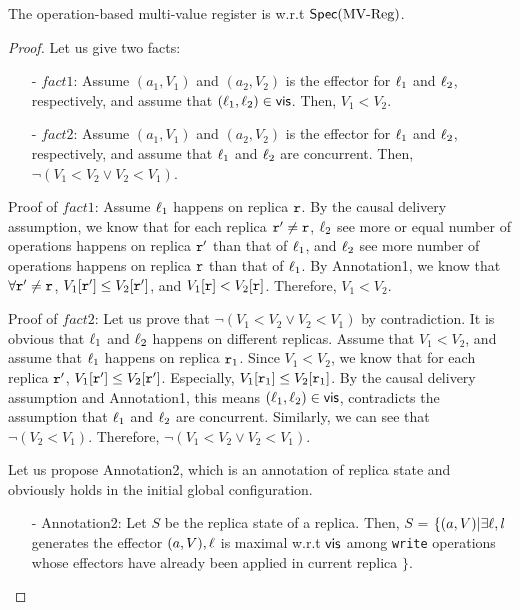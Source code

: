 \begin{lemma}
\label{lemma:multi-value register is correct}
The operation-based multi-value register is \crdtlinearizable{} w.r.t $\mathsf{Spec}(\text{MV\text{-}Reg})$.
\end{lemma}

\begin {proof}

Let us give two facts:

\begin{itemize}
\setlength{\itemsep}{0.5pt}
\item[-] $fact1$: Assume $(a_1,V_1)$ and $(a_2,V_2)$ is the effector for $\ell_1$ and $\ell_2$, respectively, and assume that $(\ell_1,\ell_2) \in \mathsf{vis}$. Then, $V_1 < V_2$.
\item[-] $fact2$: Assume $(a_1,V_1)$ and $(a_2,V_2)$ is the effector for $\ell_1$ and $\ell_2$, respectively, and assume that $\ell_1$ and $\ell_2$ are concurrent. Then, $\neg (V_1 < V_2 \vee V_2 < V_1)$.
\end{itemize}


\noindent Proof of $fact1$: Assume $\ell_1$ happens on replica $\mathtt{r}$. By the causal delivery assumption, we know that for each replica $\mathtt{r}' \neq \mathtt{r}$, $\ell_2$ see more or equal number of operations happens on replica $\mathtt{r}'$ than that of $\ell_1$, and $\ell_2$ see more number of operations happens on replica $\mathtt{r}$ than that of $\ell_1$. By Annotation1, we know that $\forall \mathtt{r}' \neq \mathtt{r}$, $V_1[\mathtt{r}'] \leq V_2[\mathtt{r}']$, and $V_1[\mathtt{r}] < V_2[\mathtt{r}]$. Therefore, $V_1 < V_2$.

\noindent Proof of $fact2$: Let us prove that $\neg (V_1 < V_2 \vee V_2 < V_1)$ by contradiction. It is obvious that $\ell_1$ and $\ell_2$ happens on different replicas. Assume that $V_1 < V_2$, and assume that $\ell_1$ happens on replica $\mathtt{r}_1$. Since $V_1 < V_2$, we know that for each replica $\mathtt{r}'$, $V_1[\mathtt{r}'] \leq V_2[\mathtt{r}']$. Especially, $V_1[\mathtt{r}_1] \leq V_2[\mathtt{r}_1]$. By the causal delivery assumption and Annotation1, this means $(\ell_1,\ell_2) \in \mathsf{vis}$, contradicts the assumption that $\ell_1$ and $\ell_2$ are concurrent. Similarly, we can see that $\neg (V_2 < V_1)$. Therefore, $\neg (V_1 < V_2 \vee V_2 < V_1)$.

Let us propose Annotation2, which is an annotation of replica state and obviously holds in the initial global configuration.

\begin{itemize}
\setlength{\itemsep}{0.5pt}
\item[-] Annotation2: Let $S$ be the replica state of a replica. Then, $S$ =  $\{ (a,V) \vert \exists \ell, l$ generates the effector $(a,V), \ell$ is maximal w.r.t $\mathsf{vis}$ among {\tt write} operations whose effectors have already been applied in current replica $\}$.
\end{itemize}


\end{proof}
